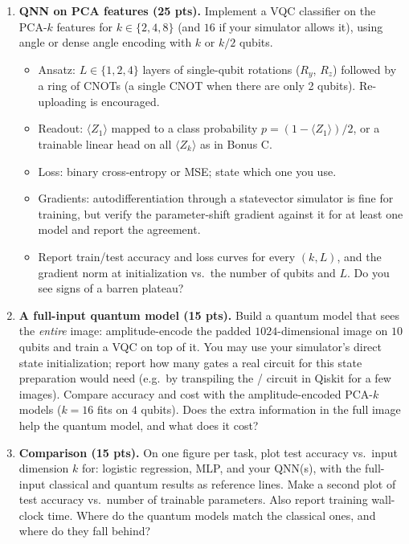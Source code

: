 \documentclass[11pt]{article}
\begin{document}
\begin{enumerate}[label=(\alph*)]
\item \textbf{QNN on PCA features (25 pts).}
Implement a VQC classifier on the PCA-$k$ features for $k\in\{2,4,8\}$ (and $16$ if your simulator allows it), using angle or dense angle encoding with $k$ or $k/2$ qubits.
\begin{itemize}
\item Ansatz: $L\in\{1,2,4\}$ layers of single-qubit rotations ($R_y$, $R_z$) followed by a ring of CNOTs (a single CNOT when there are only 2 qubits). Re-uploading is encouraged.
\item Readout: $\langle Z_1\rangle$ mapped to a class probability $p=(1-\langle Z_1\rangle)/2$, or a trainable linear head on all $\langle Z_k\rangle$ as in Bonus C.
\item Loss: binary cross-entropy or MSE; state which one you use.
\item Gradients: autodifferentiation through a statevector simulator is fine for training, but verify the parameter-shift gradient against it for at least one model and report the agreement.
\item Report train/test accuracy and loss curves for every $(k,L)$, and the gradient norm at initialization vs.\ the number of qubits and $L$. Do you see signs of a barren plateau?
\end{itemize}

\item \textbf{A full-input quantum model (15 pts).}
Build a quantum model that sees the \emph{entire} image: amplitude-encode the padded $1024$-dimensional image on $10$ qubits and train a VQC on top of it. You may use your simulator's direct state initialization; report how many gates a real circuit for this state preparation would need (e.g.\ by transpiling the / circuit in Qiskit for a few images). Compare accuracy and cost with the amplitude-encoded PCA-$k$ models ($k=16$ fits on $4$ qubits). Does the extra information in the full image help the quantum model, and what does it cost?

\item \textbf{Comparison (15 pts).}
On one figure per task, plot test accuracy vs.\ input dimension $k$ for: logistic regression, MLP, and your QNN(s), with the full-input classical and quantum results as reference lines. Make a second plot of test accuracy vs.\ number of trainable parameters. Also report training wall-clock time. Where do the quantum models match the classical ones, and where do they fall behind?


\end{enumerate}
\end{document}
